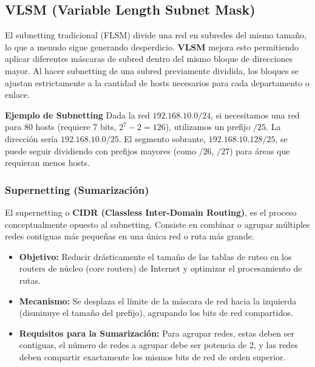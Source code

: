 \subsection{VLSM (Variable Length Subnet Mask)}
El subnetting tradicional (FLSM) divide una red en subredes del mismo tamaño, lo que a menudo sigue generando desperdicio. \textbf{VLSM} mejora esto permitiendo aplicar diferentes máscaras de subred dentro del mismo bloque de direcciones mayor. Al hacer subnetting de una subred previamente dividida, los bloques se ajustan estrictamente a la cantidad de hosts necesarios para cada departamento o enlace.

\begin{nota}{\textbf{Ejemplo de Subnetting} \newline}
    Dada la red $192.168.10.0/24$, si necesitamos una red para 80 hosts (requiere 7 bits, $2^7-2 = 126$), utilizamos un prefijo $/25$. La dirección sería $192.168.10.0/25$. El segmento sobrante, $192.168.10.128/25$, se puede seguir dividiendo con prefijos mayores (como $/26$, $/27$) para áreas que requieran menos hosts.    
\end{nota}

\subsubsection{Supernetting (Sumarización)}

El supernetting o \textbf{CIDR (Classless Inter-Domain Routing)}, es el proceso conceptualmente opuesto al subnetting. Consiste en combinar o agrupar múltiples redes contiguas más pequeñas en una única red o ruta más grande.

\begin{itemize}[label=\textcolor{acento}{$\bullet$}]
    \item \textbf{Objetivo:} Reducir drásticamente el tamaño de las tablas de ruteo en los routers de núcleo (core routers) de Internet y optimizar el procesamiento de rutas.
    \item \textbf{Mecanismo:} Se desplaza el límite de la máscara de red hacia la izquierda (disminuye el tamaño del prefijo), agrupando los bits de red compartidos.
    \item \textbf{Requisitos para la Sumarización:} Para agrupar redes, estas deben ser contiguas, el número de redes a agrupar debe ser potencia de 2, y las redes deben compartir exactamente los mismos bits de red de orden superior.
\end{itemize}


